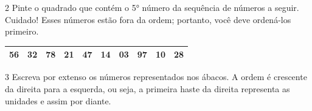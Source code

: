 
\num{2} Pinte o quadrado que contém o 5° número da sequência de números a seguir.
Cuidado! Esses números estão fora da ordem; portanto, você deve
ordená-los primeiro.

\begin{longtable}[]{@{}llllllllll@{}}
\toprule
56 & 32 & 78 & 21 & 47 & 14 & 03 & 97 & 10 & 28\tabularnewline
\bottomrule
\end{longtable}


\num{3} Escreva por extenso os números representados nos ábacos. A ordem
é crescente da direita para a esquerda, ou seja, a primeira haste da
direita representa as unidades e assim por diante.


